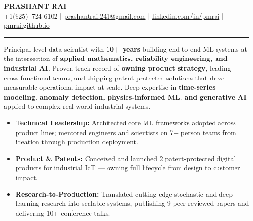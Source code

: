\documentclass[10pt, letterpaper]{article}
\begin{document}
\setlength{\baselineskip}{13pt}

\begin{center}
  {\LARGE\bfseries\color{accent} PRASHANT RAI}\\[4pt]
  {\small\color{subtext}
    +1(925)~724-6102
    \enspace\textcolor{accent}{|}\enspace
    \href{mailto:prashantrai.241@gmail.com}{prashantrai.241@gmail.com}
    \enspace\textcolor{accent}{|}\enspace
    \href{https://www.linkedin.com/in/pmrai}{linkedin.com/in/pmrai}
    \enspace\textcolor{accent}{|}\enspace
    \href{https://pmrai.github.io/}{pmrai.github.io}
  }
\end{center}

\vspace{3pt}
\textcolor{accent}{\rule{\linewidth}{1.2pt}}

\noindent
{\small Principal-level data scientist with \textbf{10+ years} building end-to-end ML systems at the intersection of \textbf{applied mathematics, reliability engineering, and industrial AI}. Proven track record of \textbf{owning product strategy}, leading cross-functional teams, and shipping patent-protected solutions that drive measurable operational impact at scale. Deep expertise in \textbf{time-series modeling, anomaly detection, physics-informed ML, and generative AI} applied to complex real-world industrial systems.}

\vspace{4pt}
\begin{itemize}\small
  \item \textbf{Technical Leadership:} Architected core ML frameworks adopted across product lines; mentored engineers and scientists on 7+ person teams from ideation through production deployment.
  \item \textbf{Product \& Patents:} Conceived and launched 2 patent-protected digital products for industrial IoT — owning full lifecycle from design to customer impact.
  \item \textbf{Research-to-Production:} Translated cutting-edge stochastic and deep learning research into scalable systems, publishing 9 peer-reviewed papers and delivering 10+ conference talks.
\end{itemize}
\end{document}
